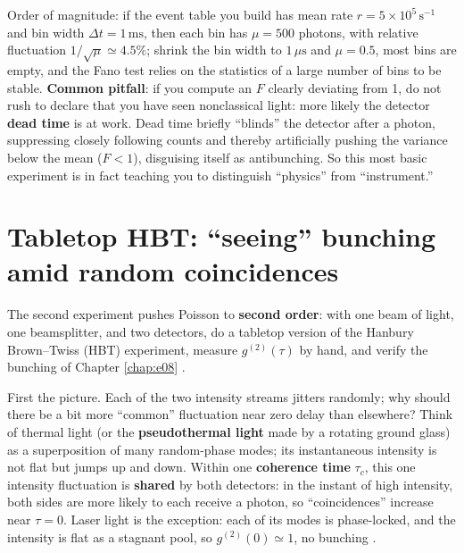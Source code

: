 Order of magnitude: if the event table you build has mean rate \(r=5\times10^{5}\,\mathrm{s^{-1}}\) and bin width \(\Delta t=1\,\mathrm{ms}\), then each bin has \(\mu=500\) photons, with relative fluctuation \(1/\sqrt{\mu}\simeq4.5\%\); shrink the bin width to \(1\,\mu\mathrm{s}\) and \(\mu=0.5\), most bins are empty, and the Fano test relies on the statistics of a large number of bins to be stable. \textbf{Common pitfall}: if you compute an \(F\) clearly deviating from 1, do not rush to declare that you have seen nonclassical light: more likely the detector \textbf{dead time} is at work. Dead time briefly ``blinds'' the detector after a photon, suppressing closely following counts and thereby artificially pushing the variance below the mean (\(F<1\)), disguising itself as antibunching. So this most basic experiment is in fact teaching you to distinguish ``physics'' from ``instrument.''

\section{Tabletop HBT: ``seeing'' bunching amid random coincidences}
\label{sec:e26-hbt}

The second experiment pushes Poisson to \textbf{second order}: with one beam of light, one beamsplitter, and two detectors, do a tabletop version of the Hanbury Brown--Twiss (HBT) experiment, measure \(g^{(2)}(\tau)\) by hand, and verify the bunching of Chapter \ref{chap:e08} \citep{1956Natur.178.1046H,1957RSPSA.242..300B,1963PhRv..130.2529G}.

First the picture. Each of the two intensity streams jitters randomly; why should there be a bit more ``common'' fluctuation near zero delay than elsewhere? Think of thermal light (or the \textbf{pseudothermal light} made by a rotating ground glass) as a superposition of many random-phase modes; its instantaneous intensity is not flat but jumps up and down. Within one \textbf{coherence time} \(\tau_c\), this one intensity fluctuation is \textbf{shared} by both detectors: in the instant of high intensity, both sides are more likely to each receive a photon, so ``coincidences'' increase near \(\tau=0\). Laser light is the exception: each of its modes is phase-locked, and the intensity is flat as a stagnant pool, so \(g^{(2)}(0)\simeq1\), no bunching \citep{1991PhRvL..67.1426N,1999PhRvA..60..674B,2024arXiv240418606N}.

